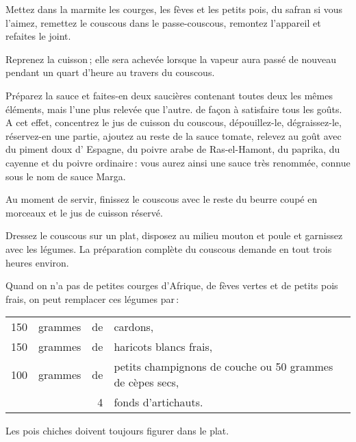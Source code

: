 Mettez dans la marmite les courges, les fèves et les petits pois, du safran si
vous l'aimez, remettez le couscous dans le passe-couscous, remontez l'appareil
et refaites le joint.

Reprenez la cuisson ; elle sera achevée lorsque la vapeur aura passé de nouveau
pendant un quart d'heure au travers du couscous.

Préparez la sauce et faites-en deux saucières contenant toutes deux les mêmes
éléments, mais l'une plus relevée que l'autre. de façon à satisfaire tous les
goûts. A cet effet, concentrez le jus de cuisson du couscous, dépouillez-le,
dégraissez-le, réservez-en une partie, ajoutez au reste de la sauce tomate,
relevez au goût avec du piment doux d' Espagne, du poivre arabe de
Ras-el-Hamont, du paprika, du cayenne et du poivre ordinaire : vous aurez ainsi
une sauce très renommée, connue sous le nom de sauce Marga.

Au moment de servir, finissez le couscous avec le reste du beurre coupé en
morceaux et le jus de cuisson réservé.

Dressez le couscous sur un plat, disposez au milieu mouton et poule et
garnissez avec les légumes. La préparation complète du couscous demande en tout
trois heures environ.

\sk

Quand on n'a pas de petites courges d'Afrique, de fèves vertes et de petits pois
frais, on peut remplacer ces légumes par :

\footnotesize
\begin{longtable}{rrrp{16em}}
    150 & grammes & de & cardons,                                                                         \\
    150 & grammes & de & haricots blancs frais,                                                           \\
    100 & grammes & de & petits champignons de couche ou 50 grammes de cèpes secs,                        \\
        &         &  4 & fonds d'artichauts.                                                              \\
\end{longtable}
\normalsize

Les pois chiches doivent toujours figurer dans le plat.

\medskip

